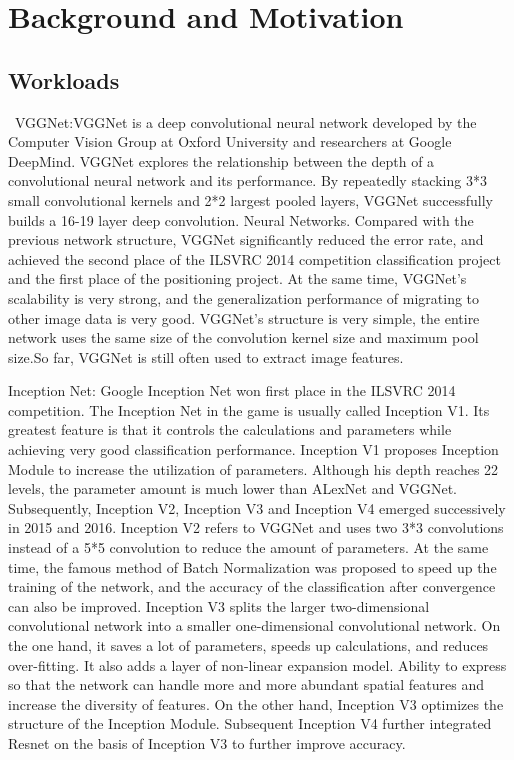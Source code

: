 \section{Background and Motivation}
\subsection{Workloads}
\ VGGNet:VGGNet is a deep convolutional neural network developed by the Computer Vision Group at Oxford University and researchers at Google DeepMind. VGGNet explores the relationship between the depth of a convolutional neural network and its performance. By repeatedly stacking 3*3 small convolutional kernels and 2*2 largest pooled layers, VGGNet successfully builds a 16-19 layer deep convolution. Neural Networks. Compared with the previous network structure, VGGNet significantly reduced the error rate, and achieved the second place of the ILSVRC 2014 competition classification project and the first place of the positioning project. At the same time, VGGNet's scalability is very strong, and the generalization performance of migrating to other image data is very good. VGGNet's structure is very simple, the entire network uses the same size of the convolution kernel size and maximum pool size.So far, VGGNet is still often used to extract image features.


Inception Net: Google Inception Net won first place in the ILSVRC 2014 competition. The Inception Net in the game is usually called Inception V1. Its greatest feature is that it controls the calculations and parameters while achieving very good classification performance. Inception V1 proposes Inception Module to increase the utilization of parameters. Although his depth reaches 22 levels, the parameter amount is much lower than ALexNet and VGGNet. Subsequently, Inception V2, Inception V3 and Inception V4 emerged successively in 2015 and 2016. Inception V2 refers to VGGNet and uses two 3*3 convolutions instead of a 5*5 convolution to reduce the amount of parameters. At the same time, the famous method of Batch Normalization was proposed to speed up the training of the network, and the accuracy of the classification after convergence can also be improved. Inception V3 splits the larger two-dimensional convolutional network into a smaller one-dimensional convolutional network. On the one hand, it saves a lot of parameters, speeds up calculations, and reduces over-fitting. It also adds a layer of non-linear expansion model. Ability to express so that the network can handle more and more abundant spatial features and increase the diversity of features. On the other hand, Inception V3 optimizes the structure of the Inception Module. Subsequent Inception V4 further integrated Resnet on the basis of Inception V3 to further improve accuracy.


